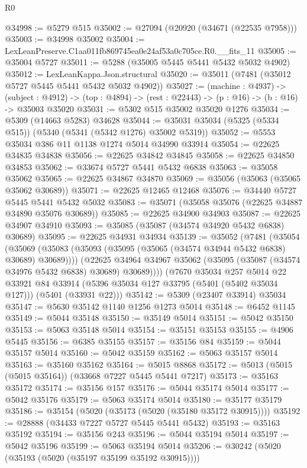 \begin{lexlean}{R0}
\begin{coremodule}
@34998 := @5279 @515
@35002 := @27094 (@20920 (@34671 (@22535 @7958)))
@35003 := @34998 @35002
@35004 := LexLeanPreserve.C1aa011fb869745ea0e24af53a0c705ce.R0.__fits_11
@35005 := @35004 @5727
@35011 := @5288 (@35005 @5445 @5441 @5432 @5032 @4902)
@35012 := LexLeanKappa.Json.structural
@35020 := @35011 (@7481 (@35012 @5727 @5445 @5441 @5432 @5032 @4902))
@35027 := (machine : @4937) ->
  (subject : @4912) -> (top : @4894) -> (rest : @22443) -> (p : @16) -> (b : @16) -> @35003 @35020
@35031 := @5302 @515 @35002 @35020 @1276
@35034 := @5309 (@14663 @5283) @34628
@35044 := @35031 @35034 (@5325 (@5334 @515)) (@5340 (@5341 (@5342 @1276) @35002 @5319))
@35052 := @5553 @35034 @386 @11 @1138 @1274 @5014 @34990 @33914
@35054 := @22625 @34835 @34838
@35056 := @22625 @34842 @34845
@35058 := @22625 @34850 @34853
@35062 := @33674 @5727 @5441 @5432 @6838
@35063 := @35058 @35062
@35065 := @22625 @34867 @34870
@35069 := @35056 (@35063 (@35065 @35062 @30689))
@35071 := @22625 @12465 @12468
@35076 := @34440 @5727 @5445 @5441 @5432 @5032
@35083 := @35071 (@35058 @35076 (@22625 @34887 @34890 @35076 @30689))
@35085 := @22625 @34900 @34903
@35087 := @22625 @34907 @34910
@35093 := @35085 (@35087 (@34574 @34920 @5432 @6838) @30689)
@35095 := @22625 @34931 @34934
@35139 := @35052
    (@7481
      (@35054
        (@35069 (@35083 (@35093 (@35095 (@35065 (@34574 @34944 @5432 @6838) @30689) @30689))))
        (@22625 @34964 @34967 @35062 (@35095 (@35087 (@34574 @34976 @5432 @6838) @30689) @30689))))
    (@7670
      @35034
      @257
      @5014
      @22
      @33921
      @84
      @33914
      (@5396 @35034 @127 @33795 (@5401 (@5402 @35034 @127)))
      (@5401 (@33931 @22)))
@35142 := @5309 (@23407 @33914) @35034
@35147 := @5630 @35142 @1140 @1256 @1273 @5014
@35148 := @6452 @1145
@35149 := @5044 @35148
@35150 := @35149 @5014
@35151 := @5042 @35150
@35153 := @5063 @35148 @5014
@35154 := @35151 @35153
@35155 := @4906 @5445
@35156 := @6385 @35155
@35157 := @35156 @84
@35159 := @5044 @35157 @5014
@35160 := @5042 @35159
@35162 := @5063 @35157 @5014
@35163 := @35160 @35162
@35164 := @5015 @8868
@35172 := @5013 (@5015 (@5015 @35164)) (@33668 @7227 @5445 @5441 @7217)
@35173 := @35163 @35172
@35174 := @35156 @157
@35176 := @5044 @35174 @5014
@35177 := @5042 @35176
@35179 := @5063 @35174 @5014
@35180 := @35177 @35179
@35186 := @35154 (@5020 (@35173 (@5020 (@35180 @35172 @30915))))
@35192 := @28888 (@34433 @7227 @5727 @5445 @5441 @5432)
@35193 := @35163 @35192
@35194 := @35156 @243
@35196 := @5044 @35194 @5014
@35197 := @5042 @35196
@35199 := @5063 @35194 @5014
@35206 := @30242 (@5020 (@35193 (@5020 (@35197 @35199 @35192 @30915))))

\end{coremodule}
\end{lexlean}
